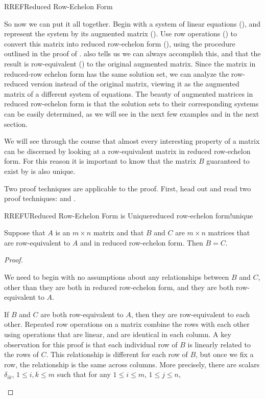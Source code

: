 \begin{subsect}{RREF}{Reduced Row-Echelon Form}
\begin{para}So now we can put it all together.  Begin with a system of linear equations (), and represent the system by its augmented matrix ().  Use row operations () to convert this matrix into reduced row-echelon form (), using the procedure outlined in the proof of .   also tells us we can always accomplish this, and that the result is row-equivalent () to the original augmented matrix.  Since the matrix in reduced-row echelon form has the same solution set, we can analyze the row-reduced version instead of the original matrix, viewing it as the augmented matrix of a different system of equations.  The beauty of augmented matrices in reduced row-echelon form is that the solution sets to their corresponding systems can be easily determined, as we will see in the next few examples and in the next section.\end{para}
%
\begin{para}We will see through the course that almost every interesting property of a matrix can be discerned by looking at a row-equivalent matrix in reduced row-echelon form.  For this reason it is important to know that the matrix $B$ guaranteed to exist by  is also unique.\end{para}
%
\begin{para}Two proof techniques are applicable to the proof. First, head out and read two proof techniques:   and .\end{para}
%
\begin{theorem}{RREFU}{Reduced Row-Echelon Form is Unique}{reduced row-echelon form!unique}
\begin{para}Suppose that $A$ is an $m\times n$ matrix and that $B$ and $C$ are $m\times n$ matrices that are row-equivalent to $A$ and in reduced row-echelon form.  Then $B=C$.\end{para}
\end{theorem}
%
\begin{proof}
\begin{para}We need to begin with no assumptions about any relationships between $B$ and $C$, other than they are both in reduced row-echelon form, and they are both row-equivalent to $A$.\end{para}
%
\begin{para}If $B$ and $C$ are both row-equivalent to $A$, then they are row-equivalent to each other.  Repeated row operations on a matrix combine the rows with each other using operations that are linear, and are identical in each column.  A key observation for this proof is that each individual row of $B$ is linearly related to the rows of $C$.  This relationship is different for each row of $B$, but once we fix a row, the relationship is the same across columns.  More precisely, there are scalars $\delta_{ik}$, $1\leq i,k\leq m$ such that for any $1\leq i\leq m$, $1\leq j\leq n$,

\end{para}
\end{proof}
\end{subsect}

